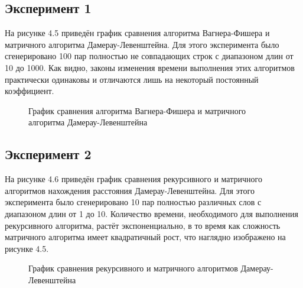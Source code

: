 \subsection{Эксперимент 1}
На рисунке 4.5 приведён график сравнения алгоритма Вагнера-Фишера и матричного алгоритма Дамерау-Левенштейна. Для этого эксперимента было сгенерировано 100 пар полностью не совпадающих строк с диапазоном длин от 10 до 1000. Как видно, законы изменения времени выполнения этих алгоритмов практически одинаковы и отличаются лишь на некоторый постоянный коэффициент.
\begin{figure}[H]
    \centering
    \caption{График сравнения алгоритма Вагнера-Фишера и матричного алгоритма Дамерау-Левенштейна}
\end{figure}

\subsection{Эксперимент 2}
На рисунке 4.6 приведён график сравнения рекурсивного и матричного алгоритмов нахождения расстояния Дамерау-Левенштейна. Для этого эксперимента было сгенерировано 10 пар полностью различных слов с диапазоном длин от 1 до 10. Количество времени, необходимого для выполнения рекурсивного алгоритма, растёт экспоненциально, в то время как сложность матричного алгоритма имеет квадратичный рост, что наглядно изображено на рисунке 4.5.
\begin{figure}[H]
    \centering
    \caption{График сравнения рекурсивного и матричного алгоритмов Дамерау-Левенштейна}
\end{figure}

